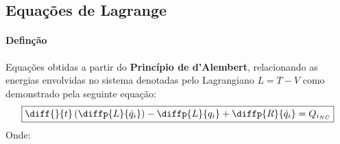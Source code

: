 \documentclass{article}
\begin{document}
        \subsection{Equações de Lagrange}
            \paragraph{Definção}Equações obtidas a partir do \textbf{Princípio de d'Alembert}, relacionando as energias envolvidas no sistema denotadas pelo Lagrangiano $L = T - V$ como demonstrado pela seguinte equação:
                \begin{equation}
                    \boxed{
                        \diff{}{t} \left(\diffp{L}{{\dot{q}_{i}}}\right) - 
                        \diffp{L}{{q_{i}}} + 
                        \diffp{R}{{\dot{q}_{i}}} = 
                        Q_{i_{NC}}
                    }
                \end{equation}
            Onde:
\end{document}
